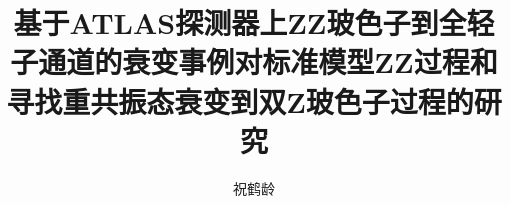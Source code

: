 \documentclass[doctor,english,pdf]{ustcthesis}
\title{基于ATLAS探测器上ZZ玻色子到全轻子通道的衰变事例对标准模型ZZ过程和寻找重共振态衰变到双Z玻色子过程的研究}
\author{祝鹤龄}
\begin{document}
\maketitle

\frontmatter
\linenumbers


\tableofcontents
\listoffigures
\listoftables

\makededicate
\newpage

\mainmatter









\appendix
%

\backmatter
%
\end{document}
